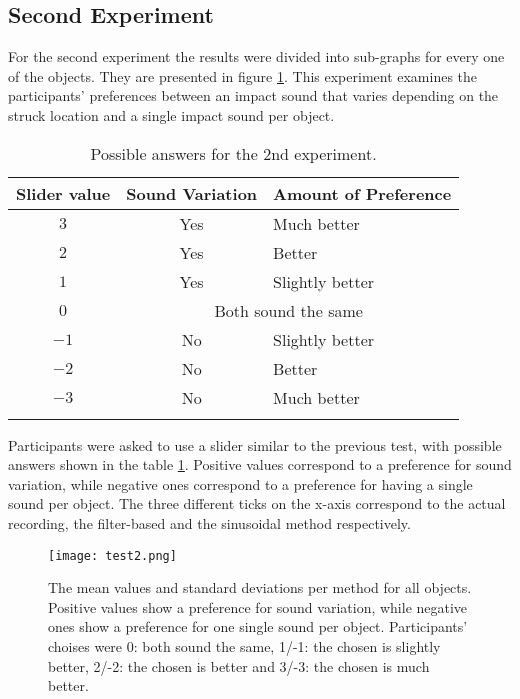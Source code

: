 \subsection{Second Experiment}
For the second experiment the results were divided into sub-graphs for every one of the objects. They are presented in figure \ref{fig:test2}. This experiment examines the participants' preferences between an impact sound that varies depending on the struck location and a single impact sound per object.

\begin{table}[H]
	\centering
    \begin{tabular}{  c  c  l  }
    \toprule
    \textbf{Slider value} & \textbf{Sound Variation} & \textbf{Amount of Preference} \\ \toprule
    \addlinespace
    $3$ & Yes & Much better \\ 
    $2$ & Yes & Better \\ 
    $1$ & Yes & Slightly better \\ 
    \addlinespace
    $0$ & \multicolumn{2}{c}{Both sound the same} \\ 
    \addlinespace
    $-1$ & No & Slightly better \\ 
    $-2$ & No & Better \\ 
    $-3$ & No & Much better \\
    \addlinespace
    \bottomrule
    \end{tabular}
    \caption{Possible answers for the 2nd experiment.}
    \label{tab:test2_ans}
\end{table}

Participants were asked to use a slider similar to the previous test, with possible answers shown in the table \ref{tab:test2_ans}. Positive values correspond to a preference for sound variation, while negative ones correspond to a preference for having a single sound per object. The three different ticks on the x-axis correspond to the actual recording, the filter-based and the sinusoidal method respectively. %

\begin{figure}[H]
  \centering
    \texttt{[image: test2.png]}
      \caption{The mean values and standard deviations per method for all objects. Positive values show a preference for sound variation, while negative ones show a preference for one single sound per object. Participants' choises were 0: both sound the same, 1/-1: the chosen is slightly better, 2/-2: the chosen is better and 3/-3: the chosen is much better.}\label{fig:test2}
\end{figure}


